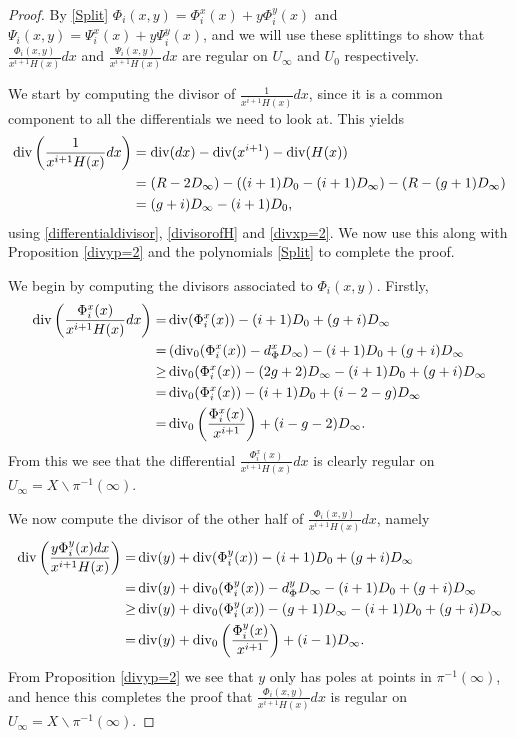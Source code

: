 \begin{proof}
    
    By \eqref{Split} $\Phi_i(x,y) = \Phi_i^x(x) + y\Phi_i^y(x)$ and $\Psi_i (x,y)= \Psi_i^x(x) + y\Psi_i^y(x)$, and we will use these splittings to show that $\frac{ \Phi_i(x,y) }{x^{i+1}H(x)}dx$ and $\frac{\Psi_i(x,y) }{x^{i+1}H(x)}dx$ are regular on $U_\infty$ and $U_0$ respectively.
    
    We start by computing the divisor of $\frac{1}{x^{i+1}H(x)}dx$, since it is a common component to all the differentials we need to look at.
    This yields
        \begin{align*}
        \operatorname{div} \left( \frac{1}{x^{i+1}H(x)}dx \right) & = \operatorname{div}(dx) - \operatorname{div} (x^{i+1}) - \operatorname{div} (H(x)) \nonumber \\
        & = (R-2D_\infty) - ((i+1)D_0 - (i+1)D_\infty) - (R - (g+1)D_\infty) \nonumber \\
        & = (g+i)D_\infty - (i+1)D_0,
        \end{align*}
    using \eqref{differentialdivisor}, \eqref{divisorofH} and \eqref{divxp=2}.
    We now use this along with Proposition \ref{divyp=2} and the polynomials \eqref{Split} to complete the proof.
    
    We begin by computing the divisors associated to $\Phi_i(x,y)$.
    Firstly,
        \begin{align*}
        \operatorname{div} \left( \frac{\Phi_i^x(x) }{x^{i+1} H(x)}dx \right)  = &  \operatorname{div}(\Phi_i^x(x)) -(i+1)D_0 + (g+i)D_\infty\\
         = & \left( \operatorname{div}_0(\Phi_i^x(x)) -d_\Phi^xD_\infty\right) -(i+1)D_0 + (g+i)D_\infty\\
         \geq & \operatorname{div}_0(\Phi_i^x(x)) - (2g+2)D_\infty - (i+1)D_0 + (g+i)D_\infty \\
         = &  \operatorname{div}_0(\Phi_i^x(x)) - (i+1)D_0 + (i-2-g)D_\infty \\
         =  & \operatorname{div}_0 \left( \frac{\Phi_i^x(x)}{x^{i+1}} \right) + (i-g-2)D_\infty.
        \end{align*}
    From this we see that the differential $\frac{\Phi_i^x(x)}{x^{i+1}H(x)}dx$ is clearly regular on $U_\infty = X \backslash \pi^{-1}(\infty)$.
    
    We now compute the divisor of the other half of $\frac{\Phi_i(x,y)}{x^{i+1}H(x)}dx$, namely
        \begin{align*}
        \operatorname{div}\left(\frac{y\Phi_i^y(x) dx}{x^{i+1}H(x)} \right)  = & \operatorname{div}(y) + \operatorname{div}(\Phi_i^y(x)) -(i+1)D_0 + (g+i)D_\infty\\
         = & \operatorname{div}(y) + \operatorname{div}_0(\Phi_i^y(x)) - d_\Phi^yD_\infty -(i+1)D_0 + (g+i)D_\infty \\
         \geq & \operatorname{div}(y) + \operatorname{div}_0(\Phi_i^y(x)) - (g+1)D_\infty - (i+1)D_0 + (g+i)D_\infty \\
         = & \operatorname{div}(y) + \operatorname{div}_0\left(\frac{\Phi_i^y(x)}{x^{i+1}} \right) + (i-1)D_\infty.
        \end{align*}
    From Proposition \ref{divyp=2} we see that $y$ only has poles at points in $\pi^{-1}(\infty)$, and hence this completes the proof that $\frac{\Phi_i(x,y) }{x^{i+1}H(x)}dx$ is regular on $U_\infty = X \backslash \pi^{-1}(\infty)$.
    

\end{proof}
